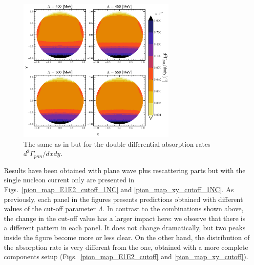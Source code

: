     \begin{figure}[h]
        \begin{center}
        \includegraphics[width=0.7\textwidth]{PlotData/PION/Dalitz_maps/figures/Dalitz_map_pnn_xy_cutofs_PWIAS.pdf}
        \end{center}
        \caption{The same as in  but for the double differential absorption rates
        $d^2 \Gamma_{pnn}/dxdy$.}
        \label{pion_map_xy_cutoff_PW}
    \end{figure}

    Results have been obtained with plane wave plus rescattering parts but with the single nucleon current only
    are presented in Figs.~\ref{pion_map_E1E2_cutoff_1NC} and \ref{pion_map_xy_cutoff_1NC}.
    As previously, each panel in the figures presents predictions obtained with different values of the cut-off parameter $\Lambda$.
    In contrast to the combinations shown above, the change in the cut-off value has a larger impact here:
    we observe that there is a different pattern in each panel. It does not change dramatically, but 
    two peaks inside the figure become more or less clear. On the other hand, the distribution of 
    the absorption rate is very different from the one, obtained with a more complete components setup 
    (Figs.~\ref{pion_map_E1E2_cutoff} and \ref{pion_map_xy_cutoff}).


